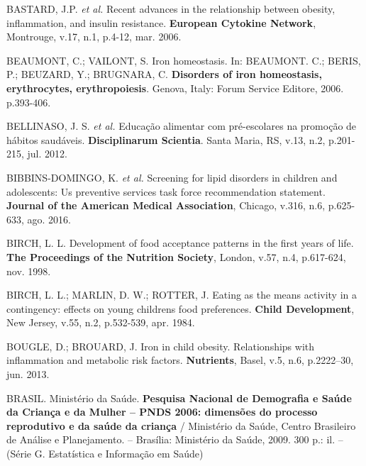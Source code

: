 \bigbreak

\noindent BASTARD, J.P. \textit{et al.} Recent advances in the relationship between obesity, inflammation, and insulin resistance. \textbf{European Cytokine Network}, Montrouge, v.17, n.1, p.4-12, mar. 2006.

\bigbreak

\noindent BEAUMONT, C.; VAILONT, S. Iron homeostasis. In: BEAUMONT. C.; BERIS, P.; BEUZARD, Y.; BRUGNARA, C. \textbf{Disorders of iron homeostasis, erythrocytes, erythropoiesis}. Genova, Italy: Forum Service Editore, 2006. p.393-406.

\bigbreak

\noindent BELLINASO, J. S. \textit{et al.} Educação alimentar com pré-escolares na promoção de hábitos saudáveis. \textbf{Disciplinarum Scientia}. Santa Maria, RS, v.13, n.2, p.201-215, jul. 2012.

\bigbreak

\noindent BIBBINS-DOMINGO, K. \textit{et al.} Screening for lipid disorders in children and adolescents: Us preventive services task force recommendation statement. \textbf{Journal of the American Medical Association}, Chicago, v.316, n.6, p.625-633, ago. 2016. 

\bigbreak
 
\noindent BIRCH, L. L. Development of food acceptance patterns in the first years of life. \textbf{The Proceedings of the Nutrition Society}, London, v.57, n.4, p.617-624, nov. 1998. 

\bigbreak

\noindent BIRCH, L. L.; MARLIN, D. W.; ROTTER, J. Eating as the means activity in a contingency: effects on young childrens food preferences. \textbf{Child Development}, New Jersey, v.55, n.2, p.532-539, apr. 1984.

\bigbreak

\noindent BOUGLE, D.; BROUARD, J. Iron in child obesity. Relationships with inflammation and metabolic risk factors. \textbf{Nutrients}, Basel, v.5, n.6, p.2222–30, jun. 2013.

\bigbreak

\noindent BRASIL. Ministério da Saúde. \textbf{Pesquisa Nacional de Demografia e Saúde da Criança e da Mulher – PNDS 2006: dimensões do processo reprodutivo e da saúde da criança} / Ministério da Saúde, Centro Brasileiro de Análise e Planejamento. – Brasília: Ministério da Saúde, 2009. 300 p.: il. – (Série G. Estatística e Informação em Saúde)

\bigbreak

